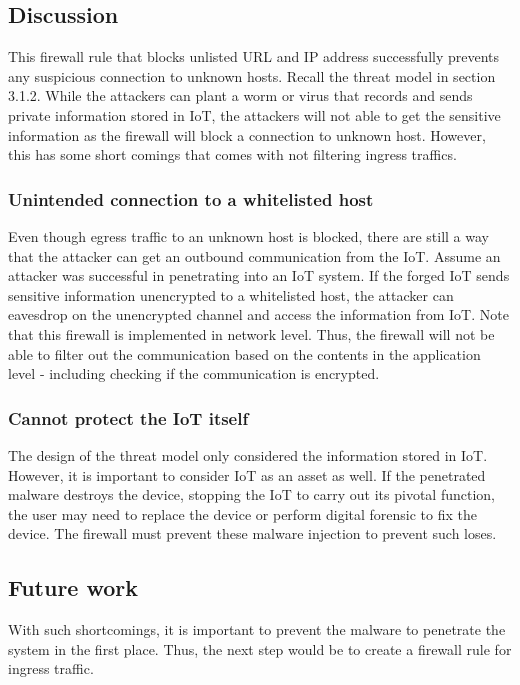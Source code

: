 \subsection{Discussion}
This firewall rule that blocks unlisted URL and IP address successfully prevents any suspicious connection to unknown hosts. Recall the threat model in section 3.1.2. While the attackers can plant a worm or virus that records and sends private information stored in IoT, the attackers will not able to get the sensitive information as the firewall will block a connection to unknown host. However, this has some short comings that comes with not filtering ingress traffics. 

\subsubsection{Unintended connection to a whitelisted host}
 Even though egress traffic to an unknown host is blocked, there are still a way that the attacker can get an outbound communication from the IoT. Assume an attacker was successful in penetrating into an IoT system. If the forged IoT sends sensitive information unencrypted to a whitelisted host, the attacker can  eavesdrop on the unencrypted channel and access the information from IoT. Note that this firewall is implemented in network level. Thus, the firewall will not be able to filter out the communication based on the contents in the application level - including checking if the communication is encrypted. 
 \subsubsection{Cannot protect the IoT itself}
 The design of the threat model only considered the information stored in IoT. However, it is important to consider IoT as an asset as well. If the penetrated malware destroys the device, stopping the IoT to carry out its pivotal function, the user may need to replace the device or perform digital forensic to fix the device. The firewall must prevent 
 these malware injection to prevent such loses. 

\subsection{Future work}
With such shortcomings, it is important to prevent the malware to penetrate the system in the first place. Thus, the next step would be to create a firewall rule for ingress traffic.


\pagebreak
